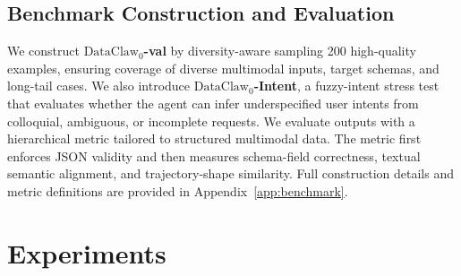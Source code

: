 \documentclass{llmxive}
\begin{document}
\subsection{Benchmark Construction and Evaluation}

We construct \textbf{$\text{DataClaw}_0$-val} by diversity-aware sampling 200 high-quality examples, ensuring coverage of diverse multimodal inputs, target schemas, and long-tail cases. We also introduce \textbf{$\text{DataClaw}_0$-Intent}, a fuzzy-intent stress test that evaluates whether the agent can infer underspecified user intents from colloquial, ambiguous, or incomplete requests.
We evaluate outputs with a hierarchical metric tailored to structured multimodal data. The metric first enforces JSON validity and then measures schema-field correctness, textual semantic alignment, and trajectory-shape similarity. Full construction details and metric definitions are provided in Appendix~\ref{app:benchmark}.





\section{Experiments}



\end{document}
